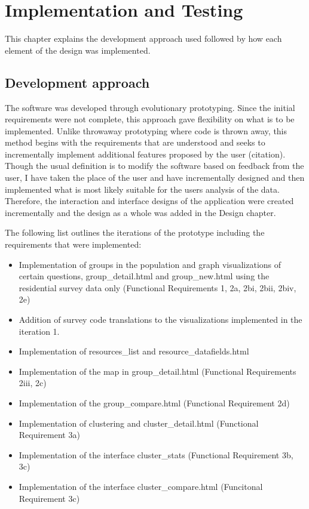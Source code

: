 \chapter{Implementation and Testing}
This chapter explains the development approach used followed by how each element of the design was implemented.


\section{Development approach} 
\label{sec:developmentapproach}
The software was developed through evolutionary prototyping. Since the initial requirements were not complete, this approach gave flexibility on what is to be implemented. Unlike throwaway prototyping where code is thrown away, this method begins with the requirements that are understood and seeks to incrementally implement additional features proposed by the user (citation). Though the usual definition is to modify the software based on feedback from the user, I have taken the place of the user and have incrementally designed and then implemented what is most likely suitable for the users\textsc{} analysis of the data. Therefore, the interaction and interface designs of the application were created incrementally and the design as a whole was added in the Design chapter.\par

The following list outlines the iterations of the prototype including the requirements that were implemented:
\begin{itemize}
	\item Implementation of groups in the population and graph visualizations of certain questions, group\_detail.html and group\_new.html using the residential survey data only (Functional Requirements 1, 2a, 2bi, 2bii, 2biv, 2e)
	\item Addition of survey code translations to the visualizations implemented in the iteration 1.
	\item Implementation of resources\_list and resource\_datafields.html
	\item Implementation of the map in group\_detail.html (Functional Requirements 2iii, 2c)
	\item Implementation of the group\_compare.html (Functional Requirement 2d)
	\item Implementation of clustering and cluster\_detail.html (Functional Requirement 3a)
	\item Implementation of the interface cluster\_stats (Functional Requirement 3b, 3c)
	\item Implementation of the interface cluster\_compare.html (Funcitonal Requirement 3c)
\end{itemize}

